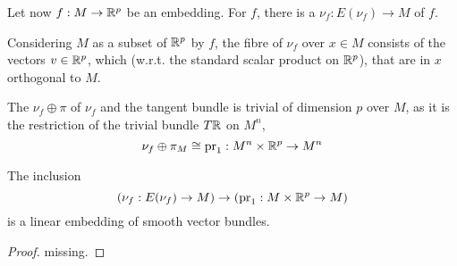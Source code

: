 \documentclass[a4paper]{article}
\begin{document}
\begin{definition}
  Let now $f:M\to\mathbb{R}^p$ be an embedding. For $f$, there is a  $\nu_f:E(\nu_f)\to M$ of $f$.
\end{definition}\cite[p.2]{brocker}

Considering $M$ as a subset of $\mathbb{R}^p$ by $f$, the fibre of $\nu_f$ over $x\in M$ consists of the vectors $v\in\mathbb{R}^p$, which (w.r.t. the standard scalar product on $\mathbb{R}^p$), that are in $x$ orthogonal to $M$.


The  $\nu_f\oplus\pi$ of $\nu_f$ and the tangent bundle is trivial of dimension $p$ over $M$, as it is the restriction of the trivial bundle $T\mathbb{R}$ on $M^n$, 
\[\nu_f\oplus\pi_M\cong\mathrm{pr}_1:M^n\times\mathbb{R}^p\to M^n\]

\begin{theorem}
  The inclusion
  \[(\nu_f:E(\nu_f)\to M)\to(\mathrm{pr}_1:M\times\mathbb{R}^p\to M)\]
  is a linear embedding of smooth vector bundles.
\end{theorem}\cite[p.2]{brocker}

\begin{proof}
  missing.
\end{proof}


\newpage\printbibliography
\end{document}
